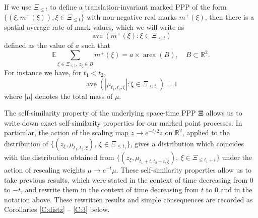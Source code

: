 \documentclass[12pt]{article}
\newcommand{\Reals}{{\mathbb{R}}}
\newcommand{\Ex}{{\mathbb E}}
\DeclareMathOperator{\area}{area}
\DeclareMathOperator{\ave}{ave}
\begin{document}
If we use $\Xi_{\le t}$ to define a translation-invariant marked PPP of the form $\{(\xi, m^+(\xi)), \xi \in \Xi_{\le t}\}$ 
with non-negative real marks $m^+(\xi)$, then  there is a 
spatial average rate of mark values,  which we will write as
\[  \ave(m^+(\xi): \xi \in \Xi_{\le t}) \]
defined as the value of $a$ such that
 \[ \Ex \sum_{\xi \in \Xi_{\le t}, \ z_\xi \in B} m^+(\xi) =  a \times \area(B) ,   \quad B \subset \Reals^2 . \]
For instance we have, for $t_1 < t_2$, 
\begin{equation}
\ave(| \mu_{t_1,t_2,\xi}|: \xi \in \Xi_{\le t_1}) = 1 
\label{ave=1}
\end{equation}
where $|\mu|$ denotes the total mass of $\mu$. 



The self-similarity property of the underlying space-time PPP $\bm{\Xi}$ allows us to write down exact 
self-similarity properties for our marked point processes. 
In particular, the action of the scaling map $z \to e^{-t/2} z$ on $\Reals^2$, applied to the distribution 
of $\{(z_\xi, \mu_{t_1,t_2,\xi}), \ \xi \in \Xi_{\le t_1} \}$, 
gives a distribution which coincides with the distribution obtained from 
$\{(z_\xi, \mu_{t_1+ t, t_2+t,\xi}), \ \xi \in \Xi_{\le t_1 +t} \}$ under the action of rescaling weights
$\mu \to  e^{-t} \mu$.
These self-similarity properties allow us to take previous
results, which were stated in the context of time decreasing from $0$ to $-t$, and rewrite them
in the context of time decreasing from $t$ to $0$ and in the notation above.  
These rewritten results and simple consequences are recorded as Corollaries \ref{C:distz} -- \ref{C:3} below.
\end{document}
